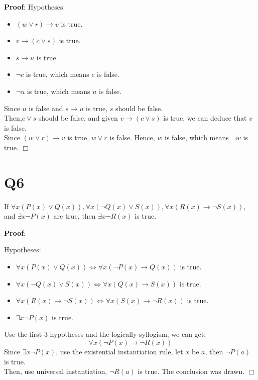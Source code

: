 \documentclass[11pt]{article}
\newenvironment{qparts}{\begin{enumerate}[{(}a{)}]}{\end{enumerate}}
\def\endproofmark{$\Box$}
\newenvironment{proof}{\par{\bf Proof}:}{\endproofmark\smallskip}
\begin{document}
\begin{qparts}
\begin{proof}
        Hypotheses:
        \begin{itemize}
            
            \item $(w \lor r)\to v$ is true.
            \item $v \to (c \lor s)$ is true.
            \item $s \to u$ is true.
            \item $\lnot c$ is true, which means $c$ is false.
            \item $\lnot u$ is true, which means $u$ is false.
        \end{itemize}
        Since $u$ is false and $s \to u$ is true, $s$ should be false.\\
        Then,$c \lor s$ should be false, and given $v \to (c \lor s)$ is true,
        we can deduce that $v$ is false.\\
        Since $(w \lor r)\to v$ is true, $w \lor r$ is false. Hence, $w$ is false, which means $\lnot w$ is true.
    \end{proof} 
\end{qparts}

\section*{Q6}
If $\forall x(P(x)\lor Q(x)),
\forall x(\lnot Q(x)\lor S(x)),
\forall x(R(x)\to \lnot S(x))$, 
and $\exists x\lnot P(x)$ are true, 
then $\exists x\lnot R(x)$ is true.
\begin{proof}
    
    Hypotheses:
    \begin{itemize}
        
        \item $\forall x(P(x)\lor Q(x))\iff\forall x(\lnot P(x)\to Q(x))$ is true.
        \item $\forall x(\lnot Q(x)\lor S(x))\iff\forall x(Q(x)\to S(x))$ is true.
        \item $\forall x(R(x)\to \lnot S(x))\iff\forall x(S(x)\to \lnot R(x))$ is true.
        \item $\exists x\lnot P(x)$ is true.
    \end{itemize}
    Use the first 3 hypotheses and the logically syllogism, we can get:
    \begin{equation*}
      \forall x(\lnot P(x)\to \lnot R(x))
    \end{equation*}
    Since $\exists x\lnot P(x)$, use the existential instantiation rule, let $x$
    be $a$, then $\lnot P(a)$ is true.\\
    Then, use universal instantiation, $\lnot R(a)$ is true. 
    The conclusion was drawn.
\end{proof}
\end{document}
